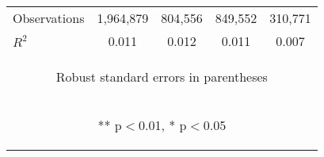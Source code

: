 \documentclass[]{article}
\begin{document}
\begin{center}
\begin{tabular}{lcccc}
Observations & 1,964,879 & 804,556 & 849,552 & 310,771 \\
 $R^2$ & 0.011 & 0.012 & 0.011 & 0.007 \\ \midrule
\multicolumn{5}{c}{\begin{footnotesize} Robust standard errors in parentheses\end{footnotesize}} \\
\multicolumn{5}{c}{\begin{footnotesize} ** p$<$0.01, * p$<$0.05\end{footnotesize}} \\
\end{tabular}
\end{center}
\end{document}
